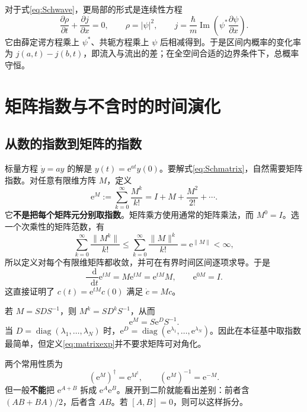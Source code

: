 \documentclass[a4paper,11pt]{article}
\numberwithin{equation}{section}
\newcommand{\dd}{\mathop{}\!\mathrm{d}}
\newcommand{\ee}{\mathrm{e}}
\newcommand{\norm}[1]{\lVert #1\rVert}
\newcommand{\abs}[1]{\lvert #1\rvert}
\begin{document}
对于式\eqref{eq:Schwave}，更局部的形式是连续性方程
\begin{equation}
  \frac{\partial\rho}{\partial t}+\frac{\partial j}{\partial x}=0,
  \qquad \rho=\abs{\psi}^2,\qquad
  j=\frac{\hbar}{m}\operatorname{Im}\left(\psi^*\frac{\partial\psi}{\partial x}\right).
\end{equation}
它由薛定谔方程乘上 $\psi^*$、共轭方程乘上 $\psi$ 后相减得到。于是区间内概率的变化率为 $j(a,t)-j(b,t)$，即流入与流出的差；在全空间合适的边界条件下，总概率守恒。

\section{矩阵指数与不含时的时间演化}
\subsection{从数的指数到矩阵的指数}
标量方程 $\dot y=ay$ 的解是 $y(t)=\ee^{at}y(0)$。要解式\eqref{eq:Schmatrix}，自然需要矩阵指数。对任意有限维方阵 $M$，定义
\begin{equation}\label{eq:matrixexp}
  \boxed{\ee^M:=\sum_{k=0}^{\infty}\frac{M^k}{k!}
  =I+M+\frac{M^2}{2!}+\cdots.}
\end{equation}
它\textbf{不是把每个矩阵元分别取指数}。矩阵乘方使用通常的矩阵乘法，而 $M^0=I$。选一个次乘性的矩阵范数，有
\[
  \sum_{k=0}^{\infty}\frac{\norm{M^k}}{k!}
  \leq\sum_{k=0}^{\infty}\frac{\norm{M}^k}{k!}
  =\ee^{\norm{M}}<\infty,
\]
所以定义对每个有限维矩阵都收敛，并可在有界时间区间逐项求导。于是
\begin{equation}\label{eq:expderiv}
  \frac{\dd}{\dd t}\ee^{tM}=M\ee^{tM}=\ee^{tM}M,
  \qquad \ee^{0M}=I.
\end{equation}
这直接证明了 $c(t)=\ee^{tM}c(0)$ 满足 $\dot c=Mc$。

若 $M=SDS^{-1}$，则 $M^k=SD^kS^{-1}$，从而
\begin{equation}
  \ee^M=S\ee^D S^{-1}.
\end{equation}
当 $D=\operatorname{diag}(\lambda_1,\ldots,\lambda_N)$ 时，$\ee^D=\operatorname{diag}(\ee^{\lambda_1},\ldots,\ee^{\lambda_N})$。因此在本征基中取指数最简单，但定义\eqref{eq:matrixexp}并不要求矩阵可对角化。

两个常用性质为
\begin{equation}
  (\ee^M)^\dagger=\ee^{M^\dagger},\qquad
  (\ee^M)^{-1}=\ee^{-M}.
\end{equation}
但一般\textbf{不能}把 $\ee^{A+B}$ 拆成 $\ee^A\ee^B$。展开到二阶就能看出差别：前者含 $(AB+BA)/2$，后者含 $AB$。若 $[A,B]=0$，则可以这样拆分。
\end{document}
